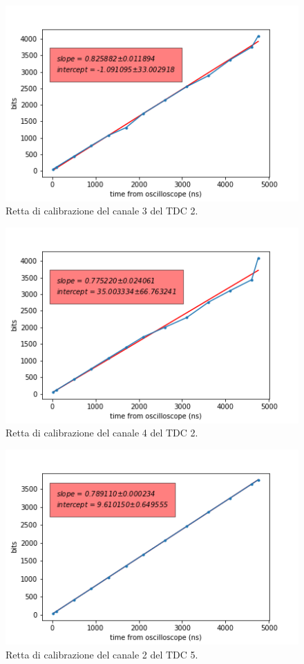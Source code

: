 \begin{figure}[H]
  \centering
  \includegraphics[width=.8\textwidth]{plots/tdc23.png}
  \caption{Retta di calibrazione del canale 3 del TDC 2.}
  \label{fig:tdc23}
\end{figure}

\begin{figure}[H]
  \centering
  \includegraphics[width=.8\textwidth]{plots/tdc24.png}
  \caption{Retta di calibrazione del canale 4 del TDC 2.}
  \label{fig:tdc24}
\end{figure}

\begin{figure}[H]
  \centering
  \includegraphics[width=.8\textwidth]{plots/tdc25.png}
  \caption{Retta di calibrazione del canale 2 del TDC 5.}
  \label{fig:tdc25}
\end{figure}

